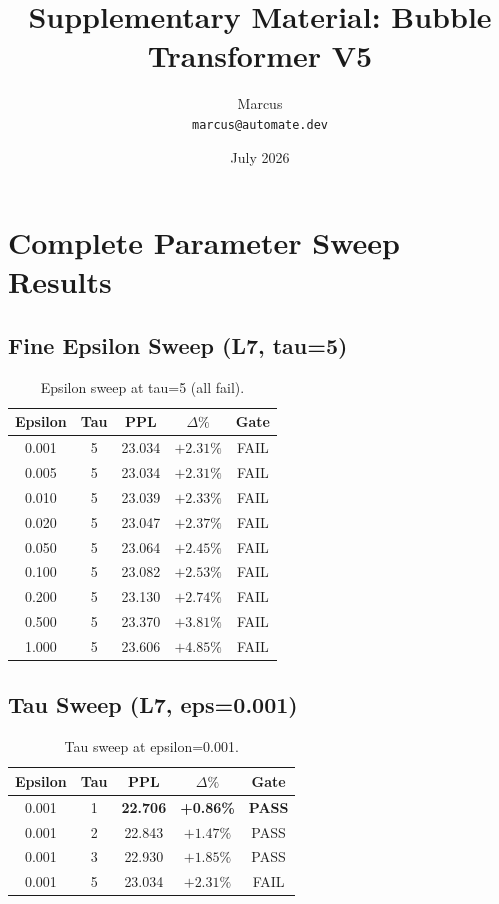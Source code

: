 \documentclass[11pt]{article}
\title{Supplementary Material: Bubble Transformer V5}
\author{Marcus\\ \texttt{marcus@automate.dev}}
\date{July 2026}
\begin{document}
\maketitle

\section{Complete Parameter Sweep Results}

\subsection{Fine Epsilon Sweep (L7, tau=5)}

\begin{table}[h]
\centering
\begin{tabular}{ccccc}
\toprule
Epsilon & Tau & PPL & $\Delta\%$ & Gate \\
\midrule
0.001 & 5 & 23.034 & $+2.31\%$ & FAIL \\
0.005 & 5 & 23.034 & $+2.31\%$ & FAIL \\
0.010 & 5 & 23.039 & $+2.33\%$ & FAIL \\
0.020 & 5 & 23.047 & $+2.37\%$ & FAIL \\
0.050 & 5 & 23.064 & $+2.45\%$ & FAIL \\
0.100 & 5 & 23.082 & $+2.53\%$ & FAIL \\
0.200 & 5 & 23.130 & $+2.74\%$ & FAIL \\
0.500 & 5 & 23.370 & $+3.81\%$ & FAIL \\
1.000 & 5 & 23.606 & $+4.85\%$ & FAIL \\
\bottomrule
\end{tabular}
\caption{Epsilon sweep at tau=5 (all fail).}
\end{table}

\subsection{Tau Sweep (L7, eps=0.001)}

\begin{table}[h]
\centering
\begin{tabular}{ccccc}
\toprule
Epsilon & Tau & PPL & $\Delta\%$ & Gate \\
\midrule
0.001 & 1 & \textbf{22.706} & \textbf{+0.86\%} & \textbf{PASS} \\
0.001 & 2 & 22.843 & $+1.47\%$ & PASS \\
0.001 & 3 & 22.930 & $+1.85\%$ & PASS \\
0.001 & 5 & 23.034 & $+2.31\%$ & FAIL \\
\bottomrule
\end{tabular}
\caption{Tau sweep at epsilon=0.001.}
\end{table}
\end{document}
